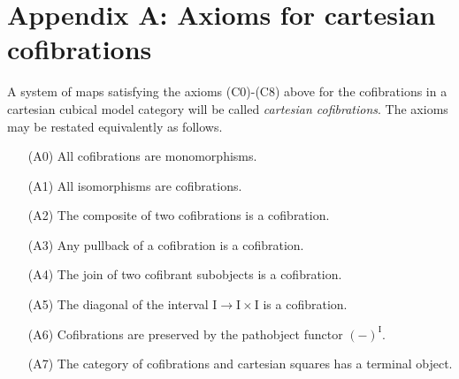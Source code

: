 \documentclass[11pt,reqno]{amsart}
\newcommand{\ra}{\ensuremath{\rightarrow}}
\newcommand{\I}{\ensuremath{\mathrm{I}}}
\theoremstyle{remark}
\theoremstyle{definition}
\begin{document}
\section*{Appendix A: Axioms for cartesian cofibrations}\label{appendix:Cofibrations}

A system of maps satisfying the axioms (C0)-(C8) above for the cofibrations in a cartesian cubical model category will be called \emph{cartesian cofibrations}. The axioms may be restated equivalently as follows.
\begin{enumerate}
\item[(A0)] All cofibrations are monomorphisms.
\item[(A1)] All isomorphisms are cofibrations.
\item[(A2)] The composite of two cofibrations is a cofibration.
\item[(A3)] Any pullback of a cofibration is a cofibration.
\item[(A4)] The join of two cofibrant subobjects is a cofibration.
\item[(A5)] The diagonal of the interval $\I\ra\I\times\I$ is a cofibration.
\item[(A6)] Cofibrations are preserved by the pathobject functor $(-)^\I$.
\item[(A7)] The category of cofibrations and cartesian squares has a terminal object.
\end{enumerate}
\end{document}
